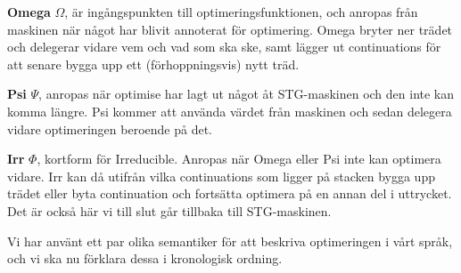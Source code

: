 \documentclass[Rapport]{subfiles}
\begin{document}
\stgOptimise


\textbf{Omega} $\Omega$, är ingångspunkten till optimeringsfunktionen, och anropas från maskinen
när något har blivit annoterat för optimering. Omega bryter ner trädet
och delegerar vidare vem och vad som ska ske, samt lägger ut continuations
för att senare bygga upp ett (förhoppningsvis) nytt träd.

\textbf{Psi} $\Psi$, anropas när optimise har lagt ut något åt STG-maskinen och
den inte kan komma längre. Psi kommer att använda värdet från maskinen
och sedan delegera vidare optimeringen beroende på det.

\textbf{Irr} $\Phi$, kortform för Irreducible. Anropas när Omega eller Psi inte
kan optimera vidare. Irr kan då utifrån vilka continuations som ligger på stacken
bygga upp trädet eller byta continuation och fortsätta optimera på en
annan del i uttrycket. Det är också här vi till slut går tillbaka till
STG-maskinen.

Vi har använt ett par olika semantiker för att beskriva optimeringen
i vårt språk, och vi ska nu förklara dessa i kronologisk ordning.









\end{document}
